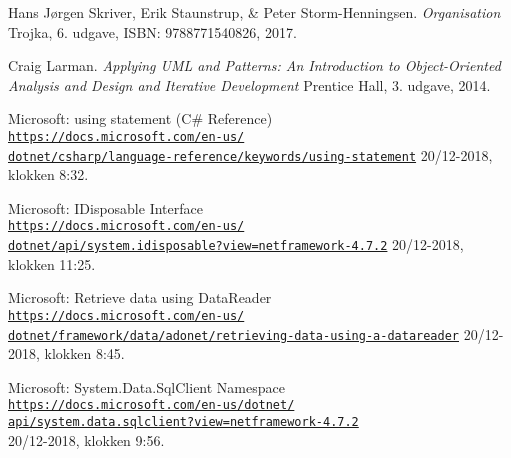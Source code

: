 \begin{thebibliography}{9}

Hans Jørgen Skriver, Erik Staunstrup, \& Peter Storm-Henningsen.
\textit{Organisation}
Trojka, 6. udgave, ISBN: 9788771540826, 2017.

Craig Larman.
\textit{Applying UML and Patterns: An Introduction to Object-Oriented Analysis and Design and Iterative Development}
Prentice Hall, 3. udgave, 2014.

Microsoft: using statement (C\# Reference)
\\\href{https://docs.microsoft.com/en-us/dotnet/csharp/language-reference/keywords/using-statement}{\texttt{https://docs.microsoft.com/en-us/\\dotnet/csharp/language-reference/keywords/using-statement}}
20/12-2018, klokken 8:32.

Microsoft: IDisposable Interface
\\\href{https://docs.microsoft.com/en-us/dotnet/api/system.idisposable?view=netframework-4.7.2}{\texttt{https://docs.microsoft.com/en-us/\\dotnet/api/system.idisposable?view=netframework-4.7.2}}
20/12-2018, klokken 11:25.

Microsoft: Retrieve data using DataReader
\\\href{https://docs.microsoft.com/en-us/dotnet/framework/data/adonet/retrieving-data-using-a-datareader}{\texttt{https://docs.microsoft.com/en-us/\\dotnet/framework/data/adonet/retrieving-data-using-a-datareader}}
20/12-2018, klokken 8:45.

Microsoft: System.Data.SqlClient Namespace
\\\href{https://docs.microsoft.com/en-us/dotnet/api/system.data.sqlclient?view=netframework-4.7.2}{\texttt{https://docs.microsoft.com/en-us/dotnet/\\api/system.data.sqlclient?view=netframework-4.7.2}}
\\20/12-2018, klokken 9:56.

\begin{comment}
\bibitem{latexcompanion} 
Michel Goossens, Frank Mittelbach, and Alexander Samarin. 
\textit{The \LaTeX\ Companion}. 
Addison-Wesley, Reading, Massachusetts, 1993.
 
\bibitem{einstein} 
Albert Einstein. 
\textit{Zur Elektrodynamik bewegter K{\"o}rper}. (German) 
[\textit{On the electrodynamics of moving bodies}]. 
Annalen der Physik, 322(10):891–921, 1905.
 
\bibitem{knuthwebsite} 
Knuth: Computers and Typesetting,
\\\texttt{http://www-cs-faculty.stanford.edu/\~{}uno/abcde.html}
\end{comment}
\end{thebibliography}
 
